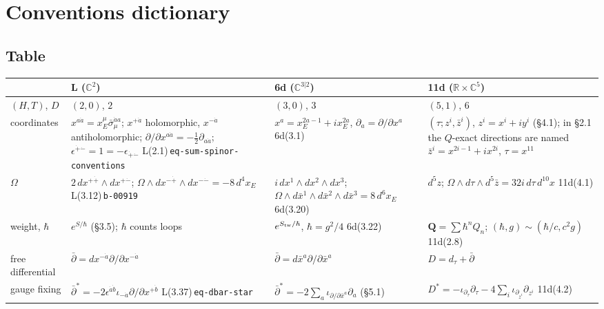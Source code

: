 \documentclass[10pt,a4paper]{article}
\numberwithin{equation}{section}
\newcommand{\dbar}{\bar\partial}
\newcommand{\bz}{\bar z}
\newcommand{\LL}[2]{\textsf{L}(#1){\scriptsize\,\texttt{#2}}}
\newcommand{\Sd}[1]{\textsf{6d}(#1)}
\newcommand{\Ed}[1]{\textsf{11d}(#1)}
\begin{document}
\section{Conventions dictionary}\label{sec-conv}

\subsection{Table}

{\footnotesize
\renewcommand{\arraystretch}{1.35}
\begin{longtable}{@{}>{\raggedright\arraybackslash}p{1.8cm}>{\raggedright\arraybackslash}p{4.5cm}>{\raggedright\arraybackslash}p{4.3cm}>{\raggedright\arraybackslash}p{4.9cm}@{}}
\toprule
 & \textsf{L} ($\mathbb C^2$) & \textsf{6d} ($\mathbb C^{3|2}$) & \textsf{11d} ($\mathbb R\times\mathbb C^5$)\\
\midrule\endhead
$(H,T)$, $D$ & $(2,0)$, $2$ & $(3,0)$, $3$ & $(5,1)$, $6$\\
coordinates & $x^{a\dot a}=x_E^\mu\bar\sigma_\mu^{\dot aa}$; $x^{+\dot a}$ holomorphic, $x^{-\dot a}$ antiholomorphic; $\partial/\partial x^{a\dot a}=-\frac12\partial_{a\dot a}$; $\epsilon^{\dot+\dot-}=1=-\epsilon_{\dot+\dot-}$ \LL{2.1}{eq-sum-spinor-conventions} & $x^a=x_E^{2a-1}+ix_E^{2a}$, $\partial_a=\partial/\partial x^a$ \Sd{3.1} & $(\tau;z^i,\bz^i)$, $z^i=x^i+iy^i$ (\S4.1); in \S2.1 the $Q$-exact directions are named $\bz^i=x^{2i-1}+ix^{2i}$, $\tau=x^{11}$\\
$\Omega$ & $2\,dx^{+\dot+}\wedge dx^{+\dot-}$; $\Omega\wedge dx^{-\dot+}\wedge dx^{-\dot-}=-8\,d^4x_E$ \LL{3.12}{b-00919} & $i\,dx^1\wedge dx^2\wedge dx^3$; $\Omega\wedge d\bar x^1\wedge d\bar x^2\wedge d\bar x^3=8\,d^6x_E$ \Sd{3.20} & $d^5z$; $\Omega\wedge d\tau\wedge d^5\bz=32i\,d\tau\,d^{10}x$ \Ed{4.1}\\
weight, $\hbar$ & $e^{S/\hbar}$ (\S3.5); $\hbar$ counts loops & $e^{S_{\rm tw}/\hbar}$, $\hbar=g^2/4$ \Sd{3.22} & $\mathbf Q=\sum\hbar^nQ_n$; $(\hbar,g)\sim(\hbar/c,c^2g)$ \Ed{2.8}\\
free differential & $\dbar=dx^{-\dot a}\partial/\partial x^{-\dot a}$ & $\dbar=d\bar x^a\partial/\partial\bar x^a$ & $D=d_\tau+\dbar$\\
gauge fixing & $\dbar^*=-2\epsilon^{\dot a\dot b}\iota_{-\dot a}\partial/\partial x^{+\dot b}$ \LL{3.37}{eq-dbar-star} & $\dbar^*=-2\sum_a\iota_{\partial/\partial\bar x^a}\partial_a$ (\S5.1) & $D^*=-\iota_{\partial_\tau}\partial_\tau-4\sum_i\iota_{\partial_{\bz^i}}\partial_{z^i}$ \Ed{4.2}\\

\end{longtable}}
\end{document}
